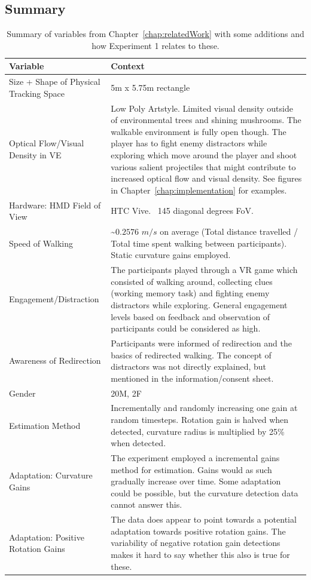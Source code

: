 \subsection{Summary}
\begin{table}[h!]
\centering
\begin{tabularx}{\textwidth}{|X|X|}
\hline
Variable & Context \\
\hline
Size + Shape of Physical Tracking Space & 5m x 5.75m rectangle \\
\hline
Optical Flow/Visual Density in VE & Low Poly Artstyle. Limited visual density outside of environmental trees and shining mushrooms. The walkable environment is fully open though. The player has to fight enemy distractors while exploring which move around the player and shoot various salient projectiles that might contribute to increased optical flow and visual density. See figures in Chapter~\ref{chap:implementation} for examples.\\
\hline
Hardware: HMD Field of View & HTC Vive. ~145 diagonal degrees FoV. \\
\hline
Speed of Walking & \textasciitilde$0.2576$ $m/s$ on average (Total distance travelled / Total time spent walking between participants). Static curvature gains employed. \\
\hline
Engagement/Distraction & The participants played through a VR game which consisted of walking around, collecting clues (working memory task) and fighting enemy distractors while exploring. General engagement levels based on feedback and observation of participants could be considered as high. \\
\hline
Awareness of Redirection & Participants were informed of redirection and the basics of redirected walking. The concept of distractors was not directly explained, but mentioned in the information/consent sheet. \\
\hline
Gender & 20M, 2F \\
\hline
Estimation Method & Incrementally and randomly increasing one gain at random timesteps. Rotation gain is halved when detected, curvature radius is multiplied by 25\% when detected. \\
\hline
Adaptation: Curvature Gains & The experiment employed a incremental gains method for estimation. Gains would as such gradually increase over time. Some adaptation could be possible, but the curvature detection data cannot answer this. \\
\hline
Adaptation: Positive Rotation Gains & The data does appear to point towards a potential adaptation towards positive rotation gains. The variability of negative rotation gain detections makes it hard to say whether this also is true for these. \\
\hline
\end{tabularx}
\caption[Experiment 1: Summary Over Contextual Variables in Relation To Detection Thresholds]{Summary of variables from Chapter~\ref{chap:relatedWork} with some additions and how Experiment 1 relates to these.}
\label{table:ex1VariableSummary}
\end{table}

